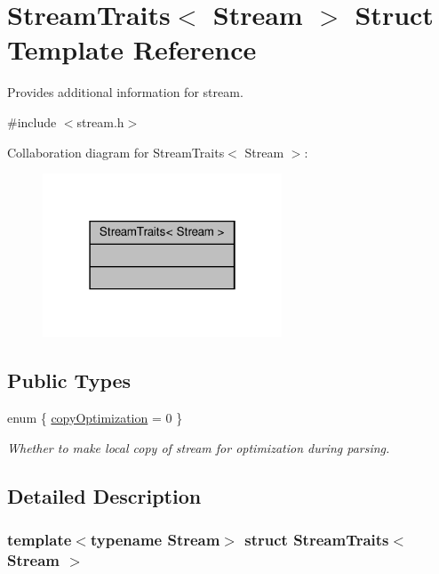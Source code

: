 \hypertarget{structStreamTraits}{}\section{Stream\+Traits$<$ Stream $>$ Struct Template Reference}
\label{structStreamTraits}


Provides additional information for stream.  




{\ttfamily \#include $<$stream.\+h$>$}



Collaboration diagram for Stream\+Traits$<$ Stream $>$\+:
\nopagebreak
\begin{figure}[H]
\begin{center}
\leavevmode
\includegraphics[width=202pt]{structStreamTraits__coll__graph}
\end{center}
\end{figure}
\subsection*{Public Types}
\begin{DoxyCompactItemize}
\item 
enum \{ \hyperlink{structStreamTraits_a6f70307b686a2577c6a274457f0688bba0300ac4c098b0d59f43a0c4e1ec86eac}{copy\+Optimization} = 0
 \}\begin{DoxyCompactList}\small\item\em Whether to make local copy of stream for optimization during parsing. \end{DoxyCompactList}
\end{DoxyCompactItemize}


\subsection{Detailed Description}
\subsubsection*{template$<$typename Stream$>$\newline
struct Stream\+Traits$<$ Stream $>$}

